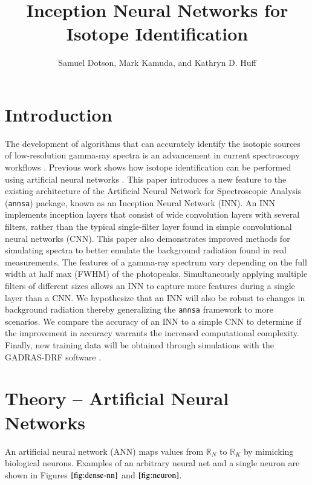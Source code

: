 \documentclass[fleqn]{anstrans}
\title{Inception Neural Networks for Isotope Identification}
\author{Samuel Dotson, Mark Kamuda, and Kathryn D. Huff}
\institute{
Dept. of Nuclear, Plasma and Radiological Engineering, University of Illinois at Urbana-Champaign \\
sgd2@illinois.edu
}
\begin{document}

\section{Introduction}
The development of algorithms that can accurately identify the isotopic sources of low-resolution gamma-ray 
spectra is an advancement in current spectroscopy workflows \cite{rawool-sullivanStepsAutomatedGamma2010}.
Previous work shows how isotope identification can be performed using 
artificial neural networks 
\cite{kamudaAutomatedIsotopeIdentification2017,kamudaComparisonMachineLearning2018a,kamudaMachineLearningApproach2018}. 
This paper introduces a new feature to the existing architecture of the Artificial Neural Network for Spectroscopic Analysis (\texttt{annsa}) package, known as an Inception Neural Network (INN). 
An INN implements inception layers that consist of wide convolution layers with several filters, rather than the typical single-filter layer found in simple convolutional neural networks (CNN).
This paper also demonstrates improved methods for simulating spectra to better emulate the background radiation found in real measurements. 
The features of a gamma-ray spectrum vary depending on the full width at half max (FWHM) of the photopeaks. 
Simultaneously applying multiple filters of different sizes allows an INN to capture more features during a single layer than a CNN. 
We hypothesize that an INN will also be robust to changes in background radiation thereby generalizing the \texttt{annsa} framework to more scenarios. 
We compare the accuracy of an INN to a simple CNN to determine if the improvement in accuracy warrants the increased computational complexity. 
Finally, new training data will be obtained through simulations with the GADRAS-DRF software \cite{mitchellGADRASIsotopeID2014}.

\section{Theory -- Artificial Neural Networks}

An artificial neural network (ANN) maps values from ${\mathbb{R}}_{N}$ to ${\mathbb{R}}_{K}$ by mimicking biological 
neurons. Examples of an arbitrary neural net and a single neuron are shown in Figures $\ref{fig:dense-nn}$ and $\ref{fig:neuron}$. 
\end{document}
